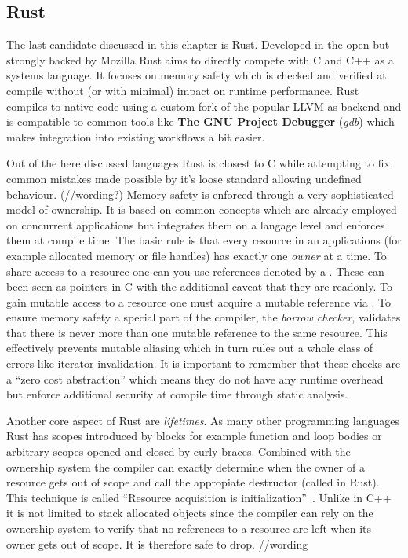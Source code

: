 \subsection*{Rust}
\label{subsec:State_of_the_art::Candidates::Rust}

The last candidate discussed in this chapter is Rust. Developed in the open but strongly backed by Mozilla Rust aims to directly compete with C and C++ as a systems language. It focuses on memory safety which is checked and verified at compile without (or with minimal) impact on runtime performance. Rust compiles to native code using a custom fork of the popular LLVM as backend and is compatible to common tools like \textbf{The GNU Project Debugger} (\textit{gdb}) which makes integration into existing workflows a bit easier.

Out of the here discussed languages Rust is closest to C while attempting to fix common mistakes made possible by it's loose standard allowing undefined behaviour. (//wording?) Memory safety is enforced through a very sophisticated model of ownership. It is based on common concepts which are already employed on concurrent applications but integrates them on a langage level and enforces them at compile time. The basic rule is that every resource in an applications (for example allocated memory or file handles) has exactly one \textit{owner} at a time. To share access to a resource one can you use references denoted by a \mdinline{\&}. These can been seen as pointers in C with the additional caveat that they are readonly. To gain mutable access to a resource one must acquire a mutable reference via . To ensure memory safety a special part of the compiler, the \textit{borrow checker}, validates that there is never more than one mutable reference to the same resource. This effectively prevents mutable aliasing which in turn rules out a whole class of errors like iterator invalidation. It is important to remember that these checks are a ``zero cost abstraction'' which means they do not have any runtime overhead but enforce additional security at compile time through static analysis.

Another core aspect of Rust are \textit{lifetimes}. As many other programming languages Rust has scopes introduced by blocks for example function and loop bodies or arbitrary scopes opened and closed by curly braces. Combined with the ownership system the compiler can exactly determine when the owner of a resource gets out of scope and call the appropiate destructor (called  in Rust). This technique is called ``Resource acquisition is initialization''~\cite[p. 389]{evolution_c++}. Unlike in C++ it is not limited to stack allocated objects since the compiler can rely on the ownership system to verify that no references to a resource are left when its owner gets out of scope. It is therefore safe to drop. //wording
\\


